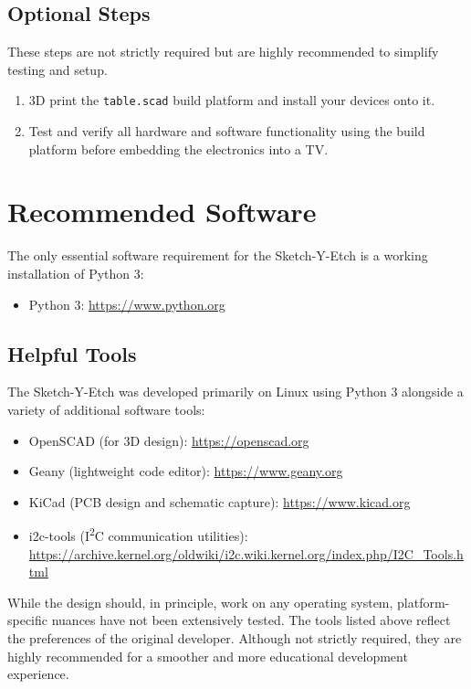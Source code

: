 \documentclass[]{article}
\begin{document}
\subsection*{Optional Steps}

These steps are not strictly required but are highly recommended to simplify testing and setup.

\begin{enumerate}
	\item 3D print the \texttt{table.scad} build platform and install your devices onto it.
	\item Test and verify all hardware and software functionality using the build platform before embedding the electronics into a TV.
\end{enumerate}

\section*{Recommended Software}

The only essential software requirement for the Sketch-Y-Etch is a working installation of Python 3:

\begin{itemize}
	\item Python 3: \url{https://www.python.org}
\end{itemize}

\subsection*{Helpful Tools}

The Sketch-Y-Etch was developed primarily on Linux using Python 3 alongside a variety of additional software tools:

\begin{itemize}
	\item OpenSCAD (for 3D design): \url{https://openscad.org}
	\item Geany (lightweight code editor): \url{https://www.geany.org}
	\item KiCad (PCB design and schematic capture): \url{https://www.kicad.org}
	\item i2c-tools (I\textsuperscript{2}C communication utilities): \url{https://archive.kernel.org/oldwiki/i2c.wiki.kernel.org/index.php/I2C_Tools.html}
\end{itemize}

While the design should, in principle, work on any operating system, platform-specific nuances have not been extensively tested.  
The tools listed above reflect the preferences of the original developer. Although not strictly required, they are highly recommended for a smoother and more educational development experience.
\end{document}
